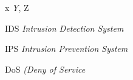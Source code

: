 \begin{siglas}
	\item[x] \emph{Y}, Z
	\item[IDS] \textit{Intrusion Detection System}
	\item[IPS] \textit{Intrusion Prevention System}
	\item[DoS] \textit{(Deny of Service}
\end{siglas}
